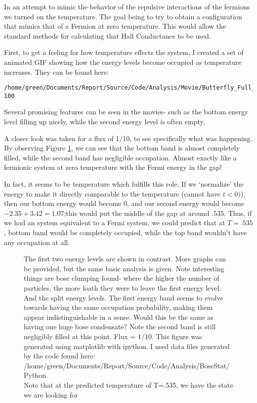 \documentclass[12pt]{article}
\begin{document}
In an attempt to mimic the behavior of the repulsive interactions of the fermions
we turned on the temperature. The goal being to try to obtain a configuration
that mimics that of a Fermion at zero temperature. This would allow the
standard methods for calculating that Hall Conductance to be used.~\cite{STREDA1982}~\cite{THOULESS1982}~\cite{2STREDA1982}

First, to get a feeling for how temperature effects the system, I created a
set of animated GIF showing how the energy levels become occupied as
temperature increases. They can be found here:
\\\begin{verbatim}/home/green/Documents/Report/Source/Code/Analysis/Movie/Butterfly_Full_Mu-100\end{verbatim}
Several promising features can be seen in the movies- such as the bottom
energy level filling up nicely, while the second energy level is often empty.

A closer look was taken for a flux of 1/10, to see specifically what was happening.
By observing Figure \ref{tempdist}, we can see that the
bottom band is almost completely filled, while the second band has negligible
occupation.
Almost exactly like a fermionic system at zero temperature with the Fermi
energy in the gap!

In fact, it seems to be temperature which fulfills this role. If we `normalize'
the energy to make it directly comparable to the temperature (cannot have $t <
0)$), then our bottom energy would become 0, and our second energy would
become $-2.35+3.42 = 1.07$;this would put the middle of the gap at around
$.535$. Thus, if we had an system equivalent to a Fermi system, we could
predict that at $T = .535$, bottom band would be completely occupied, while the
top band wouldn't have any occupation at all.

\begin{figure}[H]
	\centerline{}
	\caption{The first two energy levels are shown in contrast. More graphs can
	be provided, but the same basic analysis is given.
	Note interesting things are bose clumping found- where the higher the
	number of particles, the more loath they were to leave the first energy level.
	And the split energy levels. The first energy band seems to evolve towards
	having the same occupation probability, making them appear indistinguishable
	in a sense. Would this be the same as having one huge bose condensate? Note the
	second band is still negligibly filled at this point. Flux = 1/10.
	This figure was generated using matplotlib with ipython. I used data files
	generated by the code found here:
        \\ /home/green/Documents/Report/Source/Code/Analysis/BoseStat/Python
        \\Note that at the predicted temperature of T=.535, we have the
        state we are looking for
	}
	\label{tempdist}
\end{figure} %
\end{document}
